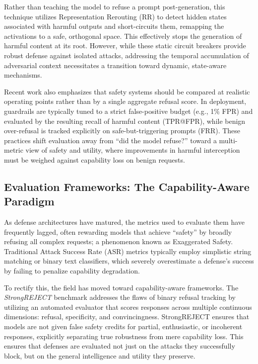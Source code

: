 \documentclass[10pt, twocolumn]{article}
\begin{document}
Rather than teaching the model to refuse a prompt post-generation, this technique utilizes Representation Rerouting (RR) to detect hidden states associated with harmful outputs and short-circuits them, remapping the activations to a safe, orthogonal space. This effectively stops the generation of harmful content at its root. However, while these static circuit breakers provide robust defense against isolated attacks, addressing the temporal accumulation of adversarial context necessitates a transition toward dynamic, state-aware mechanisms.

Recent work also emphasizes that safety systems should be compared at realistic operating points rather than by a single aggregate refusal score. In deployment, guardrails are typically tuned to a strict false-positive budget (e.g., 1\% FPR) and evaluated by the resulting recall of harmful content (TPR@FPR), while benign over-refusal is tracked explicitly on safe-but-triggering prompts (FRR). These practices shift evaluation away from ``did the model refuse?'' toward a multi-metric view of safety and utility, where improvements in harmful interception must be weighed against capability loss on benign requests.

\subsection{Evaluation Frameworks: The Capability-Aware Paradigm}
As defense architectures have matured, the metrics used to evaluate them have frequently lagged, often rewarding models that achieve ``safety'' by broadly refusing all complex requests; a phenomenon known as Exaggerated Safety. Traditional Attack Success Rate (ASR) metrics typically employ simplistic string matching or binary text classifiers, which severely overestimate a defense's success by failing to penalize capability degradation.

To rectify this, the field has moved toward capability-aware frameworks. The \textit{StrongREJECT} benchmark \cite{souly2024strongreject} addresses the flaws of binary refusal tracking by utilizing an automated evaluator that scores responses across multiple continuous dimensions: refusal, specificity, and convincingness. StrongREJECT ensures that models are not given false safety credits for partial, enthusiastic, or incoherent responses, explicitly separating true robustness from mere capability loss. This ensures that defenses are evaluated not just on the attacks they successfully block, but on the general intelligence and utility they preserve.
\end{document}
